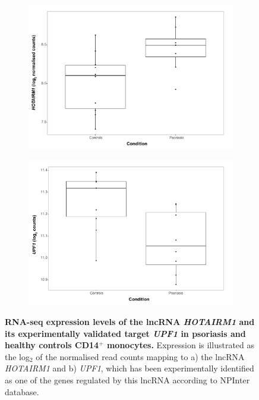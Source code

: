 \begin{figure}[htbp]
\centering
\begin{subfigure}{0.45\textwidth}
\centering
\includegraphics[width=\textwidth]{./Results2/pdfs/RNAseq_PS_CTL_lncRNA_HOTAIRM1_CD14}
\caption{\textbf{}}
\end{subfigure}%
\begin{subfigure}{0.45\textwidth}
\centering
\includegraphics[width=\textwidth]{./Results2/pdfs/RNAseq_PS_CTL_lncRNA_UPF1_CD14}
\caption{\textbf{}}
\end{subfigure}
\caption[RNA-seq expression levels of the lncRNA \textit{HOTAIRM1} and its experimentally validated target \textit{UPF1} in psoriasis and healthy controls CD14$^+$ monocytes.]{\textbf{RNA-seq expression levels of the lncRNA \textit{HOTAIRM1} and its experimentally validated target \textit{UPF1} in psoriasis and healthy controls CD14$^+$ monocytes.} Expression is illustrated as the log$_2$ of the normalised read counts mapping to a) the lncRNA \textit{HOTAIRM1} and b) \textit{UPF1}, which has been experimentally identified as one of the genes regulated by this lncRNA according to NPInter database.}
\label{figure:RNAseq_PS_CTL_CD14_expression_HOTAIRM_UPF1}
\end{figure} 


